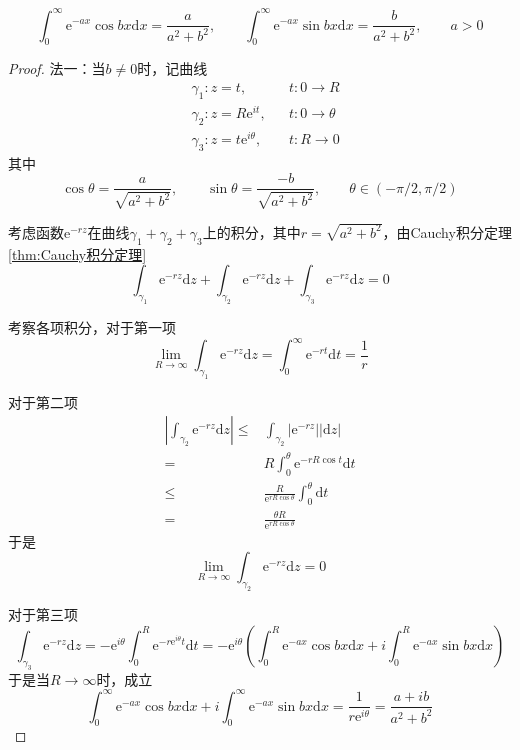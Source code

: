 \documentclass[lang = cn, scheme = chinese, thmcnt = section]{elegantbook}
\begin{document}
\begin{example}
	$$
	\int_0^{\infty}{\mathrm{e}^{-ax}\cos{bx}\mathrm{d}x}=\frac{a}{a^2+b^2},\qquad 
	\int_0^{\infty}{\mathrm{e}^{-ax}\sin{bx}\mathrm{d}x}=\frac{b}{a^2+b^2},\qquad a>0
	$$
\end{example}

\begin{proof}
	法一：当$b\ne0$时，记曲线
	\begin{align*}
		&\gamma_1:z=t,&& t:0\to R\\
		&\gamma_2:z=R\mathrm{e}^{it},&& t:0\to\theta\\
		&\gamma_3:z=t\mathrm{e}^{i\theta},&& t:R\to0
	\end{align*}
	其中%
	$$
	\cos\theta=\frac{a}{\sqrt{a^2+b^2}},\qquad 
	\sin{\theta}=\frac{-b}{\sqrt{a^2+b^2}},\qquad 
	\theta\in(-\pi/2,\pi/2)
	$$
	
	考虑函数$\mathrm{e}^{-rz}$在曲线$\gamma_1+\gamma_2+\gamma_3$上的积分，其中$r=\sqrt{a^2+b^2}$，由Cauchy积分定理\ref{thm:Cauchy积分定理}
	$$
	\int_{\gamma_1}{\mathrm{e}^{-rz}\mathrm{d}z}+\int_{\gamma_2}{\mathrm{e}^{-rz}\mathrm{d}z}+\int_{\gamma_3}{\mathrm{e}^{-rz}\mathrm{d}z}=0
	$$
	
	考察各项积分，对于第一项
	$$
	\lim_{R\to\infty}\int_{\gamma_1}{\mathrm{e}^{-rz}\mathrm{d}z}
	=\int_0^\infty{\mathrm{e}^{-rt}\mathrm{d}t}
	=\frac{1}{r}
	$$
	
	对于第二项
	\begin{align*}
		\left|\int_{\gamma_2}{\mathrm{e}^{-rz}\mathrm{d}z}\right|
		\le&\int_{\gamma_2}{\left|\mathrm{e}^{-rz}\right||\mathrm{d}z|}\\
		=&R\int_0^\theta{\mathrm{e}^{-rR\cos{t}}\mathrm{d}t}\\
		\le&\frac{R}{\mathrm{e}^{rR\cos{\theta}}}\int_0^\theta{\mathrm{d}t}\\
		=&\frac{\theta R}{\mathrm{e}^{rR\cos{\theta}}}
	\end{align*}
	于是
	$$
	\lim_{R\to\infty}{\int_{\gamma_2}{\mathrm{e}^{-rz}\mathrm{d}z}}=0
	$$
	
	对于第三项
	$$
	\int_{\gamma_3}{\mathrm{e}^{-rz}\mathrm{d}z}=-\mathrm{e}^{i\theta}\int_0^R{\mathrm{e}^{-r\mathrm{e}^{i\theta}t}\mathrm{d}t}=
	-\mathrm{e}^{i\theta}\left(\int_0^{R}{\mathrm{e}^{-ax}\cos{bx}\mathrm{d}x}+i\int_0^{R}{\mathrm{e}^{-ax}\sin{bx}\mathrm{d}x}\right)
	$$
	于是当$R\to\infty$时，成立
	$$
	\int_0^{\infty}{\mathrm{e}^{-ax}\cos{bx}\mathrm{d}x}+i\int_0^{\infty}{\mathrm{e}^{-ax}\sin{bx}\mathrm{d}x}=\frac{1}{r\mathrm{e}^{i\theta}}=\frac{a+ib}{a^2+b^2}
	$$
	

\end{proof}
\end{document}
